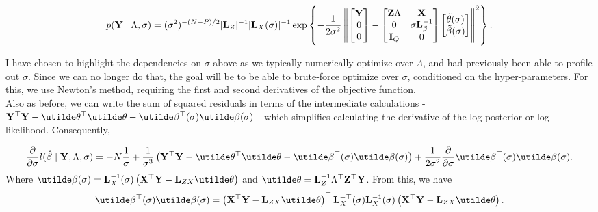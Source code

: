 \documentclass[10pt]{article}
\begin{document}
\begin{equation*}
p({\bf Y} \mid \Lambda, \sigma) =
(\sigma^2)^{-(N - P)/2}|{\bf L}_Z|^{-1}
|{\bf L}_X(\sigma)|^{-1}
\exp\left\{-\frac{1}{2\sigma^2}
\left\|
\begin{bmatrix}{\bf Y} \\ 0 \\ 0 \end{bmatrix} -
\begin{bmatrix}{\bf Z}\Lambda & {\bf X} \\
0 & \sigma{\bf L}^{-1}_\beta \\
{\bf I}_Q & 0
\end{bmatrix}
\begin{bmatrix} \tilde\theta(\sigma) \\ \tilde\beta(\sigma) \end{bmatrix}
\right\|^2
\right\}.
\end{equation*}

I have chosen to highlight the dependencies on $\sigma$ above as we
typically numerically optimize over $\Lambda$, and had previously been
able to profile out $\sigma$. Since we can no longer do that, the
goal will be to be able to brute-force optimize over $\sigma$,
conditioned on the hyper-parameters. For this, we use Newton's method,
requiring the first and second derivatives of the objective function.\\

Also as before, we can write the sum of squared residuals in terms of
the intermediate calculations - ${\bf Y}^\top{\bf Y} -
\utilde\theta^\top\utilde\theta -
\utilde\beta^\top(\sigma)\utilde\beta(\sigma)$ - which simplifies calculating the
derivative of the log-posterior or log-likelihood. Consequently,

\begin{equation*}
\frac{\partial}{\partial\sigma}l(\hat\beta \mid {\bf Y}, \Lambda,
\sigma) = 
-N\frac{1}{\sigma} + \frac{1}{\sigma^3}\left({\bf Y}^\top{\bf
    Y}-\utilde\theta^\top\utilde\theta
  -\utilde\beta^\top(\sigma)\utilde\beta(\sigma)\right) + 
\frac{1}{2\sigma^2}\frac{\partial}{\partial\sigma}\utilde\beta^\top(\sigma)\utilde\beta(\sigma).
\end{equation*}
Where $\utilde\beta(\sigma) = {\bf L}_X^{-1}(\sigma)\left({\bf
    X}^\top{\bf Y} - {\bf L}_{ZX}\utilde\theta\right)$ and
$\utilde\theta = {\bf L}_Z^{-1}\Lambda^\top{\bf Z}^\top{\bf Y}$. From this, we have
\begin{equation*}
\utilde\beta^\top(\sigma)\utilde\beta(\sigma) = 
\left({\bf X}^\top{\bf Y} - {\bf L}_{ZX}\utilde\theta\right)^\top
{\bf L}_X^{-\top}(\sigma){\bf L}_X^{-1}(\sigma)\left({\bf X}^\top{\bf Y} - {\bf
    L}_{ZX}\utilde\theta\right).
\end{equation*}
\end{document}
